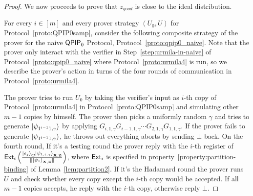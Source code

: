 \begin{proof}
We now proceeds to prove that $z_{good}$ is close to the ideal distribution. 

For every $i\in [m]$ and every prover strategy $(U_0,U)$ for Protocol~\ref{proto:QPIP0samp}, consider the following composite strategy of the prover for the naive $\operatorname{\mathsf{QPIP}}_0$ Protocol, Protocol~\ref{proto:qpip0_naive}. Note that the prover only interact with the verifier in Step~\ref{step:urmila-in-naive} of Protocol~\ref{proto:qpip0_naive} where Protocol~\ref{proto:urmila4} is run, so we describe the prover's action in turns of the four rounds of communication in Protocol~\ref{proto:urmila4}.

The prover tries to run $U_0$ by taking the verifier's input as $i$-th copy of Protocol~\ref{proto:urmila4} in Protocol~\ref{proto:QPIP0samp} and simulating other $m-1$ copies by himself. The prover then picks a uniformly random $\gamma$ and  tries to generate $\ket{\psi_{1^{i-1}1,\gamma}}$ by applying $G_{i,1,\gamma}G_{i-1,1,\gamma} \cdots G_{2,1,\gamma}G_{1,1,\gamma}$. If the prover fails to generate $\ket{\psi_{1^{i-1}1,\gamma}}$, he throws out everything aborts by sending $\bot$ back.   On the fourth round,  If it's a testing round the prover reply with the $i$-th register of $\mathsf{Ext}_i\left(\frac{\ket{e_j}_{\mathbf{C}}\ket{\psi_{1,i,\gamma}}_{\mathbf{X},\mathbf{Z}}}{\|\ket{\psi_1}_{\mathbf{X},\mathbf{Z}}\|}\right)$, where $\mathsf{Ext}_i$ is specified in property~\ref{property:partition-binding} of Lemma~\ref{lem:partition2}. If it's the Hadamard round  the prover  runs $U$ and check whether every copy except the $i$-th copy would be accepted. If all $m-1$ copies accepts, he reply with the $i$-th copy, otherwise reply $\bot$. 


\end{proof}
